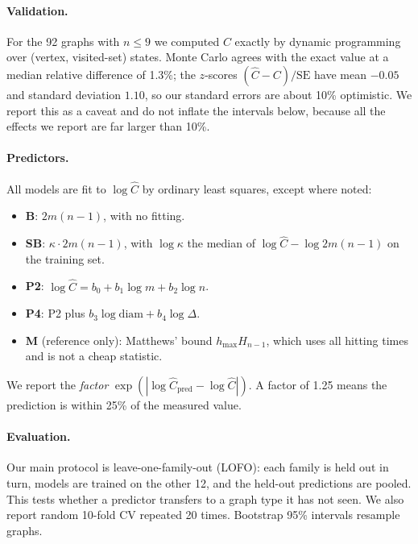 \documentclass{article}
\begin{document}
\paragraph{Validation.} For the 92 graphs with $n\le 9$ we computed $C$ exactly by dynamic programming over (vertex, visited-set) states. Monte Carlo agrees with the exact value at a median relative difference of 1.3\%; the $z$-scores $(\hat C-C)/\mathrm{SE}$ have mean $-0.05$ and standard deviation $1.10$, so our standard errors are about 10\% optimistic. We report this as a caveat and do not inflate the intervals below, because all the effects we report are far larger than 10\%.

\paragraph{Predictors.} All models are fit to $\log \hat C$ by ordinary least squares, except where noted:
\begin{itemize}
\item \textbf{B}: $2m(n-1)$, with no fitting.
\item \textbf{SB}: $\kappa\cdot 2m(n-1)$, with $\log\kappa$ the median of $\log\hat C - \log 2m(n-1)$ on the training set.
\item \textbf{P2}: $\log\hat C = b_0 + b_1\log m + b_2\log n$.
\item \textbf{P4}: P2 plus $b_3\log\mathrm{diam} + b_4\log\Delta$.
\item \textbf{M} (reference only): Matthews' bound $h_{\max}H_{n-1}$, which uses all hitting times and is not a cheap statistic.
\end{itemize}
We report the \emph{factor} $\exp(|\log\hat C_{\text{pred}}-\log\hat C|)$. A factor of 1.25 means the prediction is within 25\% of the measured value.

\paragraph{Evaluation.} Our main protocol is leave-one-family-out (LOFO): each family is held out in turn, models are trained on the other 12, and the held-out predictions are pooled. This tests whether a predictor transfers to a graph type it has not seen. We also report random 10-fold CV repeated 20 times. Bootstrap 95\% intervals resample graphs.
\end{document}
